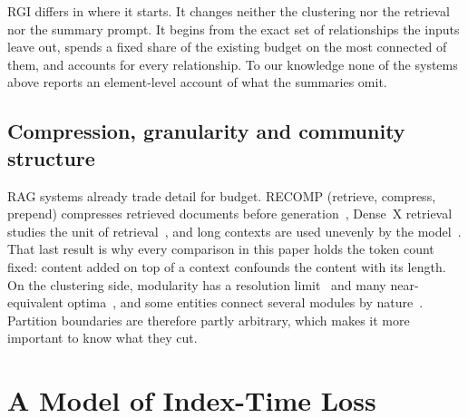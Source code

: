 \documentclass[journal]{IEEEtran}
\theoremstyle{remark}
\begin{document}
RGI differs in where it starts. It changes neither the clustering nor the retrieval nor the summary prompt. It begins from the exact set of relationships the inputs leave out, spends a fixed share of the existing budget on the most connected of them, and accounts for every relationship. To our knowledge none of the systems above reports an element-level account of what the summaries omit.

\subsection{Compression, granularity and community structure}
RAG systems already trade detail for budget. RECOMP (retrieve, compress, prepend) compresses retrieved documents before generation~\cite{xu2024recomp}, Dense~X retrieval studies the unit of retrieval~\cite{chen2024densex}, and long contexts are used unevenly by the model~\cite{liu2024lost}. That last result is why every comparison in this paper holds the token count fixed: content added on top of a context confounds the content with its length. On the clustering side, modularity has a resolution limit~\cite{fortunato2007resolution} and many near-equivalent optima~\cite{good2010modularity,fortunato2010community}, and some entities connect several modules by nature~\cite{guimera2005cartography}. Partition boundaries are therefore partly arbitrary, which makes it more important to know what they cut.

\section{A Model of Index-Time Loss}\label{sec:model}
\end{document}
